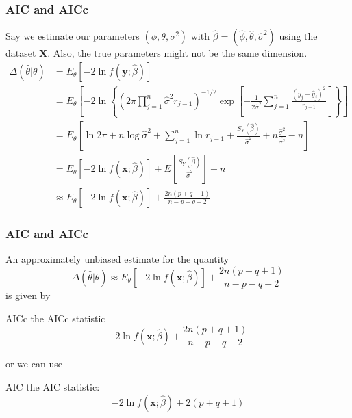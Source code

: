 \documentclass{beamer}
\begin{document}

\begin{frame}[fragile]
\frametitle{AIC and AICc}

Say we estimate our parameters $(\phi,\theta, \sigma^2)$ with $\hat{\beta} = (\hat{\phi}, \hat{\theta}, \hat{\sigma}^2)$ using the dataset $\mathbf{X}$. Also, the true parameters might not be the same dimension.
\begin{align*}
\Delta(\hat{\theta}|\theta) &= E_{\theta}\left[ -2 \ln f(\mathbf{y} ; \hat{\beta})  \right] \\
&= E_{\theta}\left[ - 2 \ln \left\{(2 \pi  \prod_{j=1}^n \hat{\sigma}^2 r_{j-1} )^{-1/2} \exp\left[-\frac{1}{2 \hat{\sigma}^2}\sum_{j=1}^n \frac{(y_j - \hat{y}_j)^2 }{r_{j-1} } \right] \right\}   \right] \\
&= E_{\theta}\left[\ln 2 \pi + n \log \hat{\sigma}^2 + \sum_{j=1}^n \ln r_{j-1} + \frac{S_Y(\hat{\beta}) }{ \hat{\sigma}^2 }  +n\frac{ \hat{\sigma}^2 }{\hat{\sigma^2} } -n \right] \\
&= E_{\theta}\left[- 2 \ln f(\mathbf{x};\hat{\beta} ) \right]   + E\left[\frac{S_Y(\hat{\beta}) }{\hat{\sigma}^2 }\right]   -n \\
&\approx E_{\theta}\left[- 2 \ln f(\mathbf{x};\hat{\beta})  \right] + \frac{2n(p+q+1)}{n-p-q-2 } \tag{we won't prove this part}
\end{align*}



\end{frame}


\begin{frame}[fragile]
\frametitle{AIC and AICc}
An approximately unbiased estimate for the quantity
\[
\Delta(\hat{\theta}|\theta) \approx E_{\theta}\left[- 2 \ln f(\mathbf{x};\hat{\beta})  \right] + \frac{2n(p+q+1)}{n-p-q-2 }
\]
is given by
\begin{block}{AICc}
the AICc statistic
\[
- 2 \ln f(\mathbf{x};\hat{\beta})  + \frac{2n(p+q+1)}{n-p-q-2 }
\]
\end{block}
or we can use
\begin{block}{AIC}
the AIC statistic:
\[
- 2 \ln f(\mathbf{x};\hat{\beta})  + 2(p+q+1)
\]
\end{block}

\end{frame}
\end{document}
